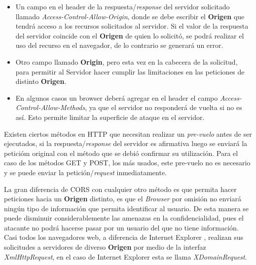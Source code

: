         \begin{itemize}
            \item Un campo en el header de la respuesta/\textit{response} del servidor solicitado llamado \textit{Access-Control-Allow-Origin}, donde se debe escribir el \textbf{Origen} que tendrá acceso a los recursos solicitados al servidor. Si el valor de la respuesta del servidor coincide con el \textbf{Origen} de quien lo solicitó, se podrá realizar el uso del recurso en el navegador, de lo contrario se generará un error.

            \item Otro campo llamado \textbf{Origin}, pero esta vez en la cabecera de la solicitud, para permitir al Servidor hacer cumplir las limitaciones en las peticiones de distinto \textbf{Origen}.

            \item En algunos casos un browser deberá agregar en el header el campo \textit{Access-Control-Allow-Methods}, ya que el servidor no responderá de vuelta si no es así. Esto permite limitar la superficie de ataque en el servidor.

        \end{itemize}
    Existen ciertos métodos en HTTP que necesitan realizar un \textit{pre-vuelo} antes de ser ejecutados, si la respuesta/\textit{response} del servidor es afirmativa luego se enviará la peticióm original con el método que se debió confirmar su utilización. Para el caso de los métodos GET y POST, los más usados, este pre-vuelo no es necesario y se puede enviar la petición/\textit{request} inmediatamente.
    
    La gran diferencia de CORS con cualquier otro método es que permita hacer peticiones hacia un \textbf{Origen} distinto, es que el \textit{Browser} por omisión no enviará ningún tipo de información que permita identificar al usuario. De esta manera se puede disminuir considerablemente las amenazas en la confidencialidad, pues el atacante no podrá hacerse pasar por un usuario del que no tiene información. Casi todos los navegadores web, a diferencia de Internet Explorer \cite{bookWebAppSec}, realizan sus solicitudes a servidores de diverso \textbf{Origen} por medio de la interfaz \textit{XmlHttpRequest}, en el caso de Internet Explorer esta se llama \textit{XDomainRequest}.

